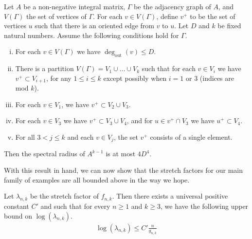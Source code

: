 \begin{lem}
\label{lem:spectral}
Let $A$ be a non-negative integral matrix, $\Gamma$ be the adjacency graph of $A$, and $V(\Gamma)$ the set of
vertices of $\Gamma$. For each $v \in V(\Gamma)$, define $v^+$ to be the set of vertices $u$ such that there
is an oriented edge from $v$ to $u$. Let $D$ and $k$ be fixed natural numbers. Assume the following conditions
hold for $\Gamma$.
\begin{enumerate}[(i)]
\item For each $v \in V(\Gamma)$ we have $\deg_{\text{out}}(v) \leq D$.
\item There is a partition $V(\Gamma) = V_1 \cup \dots \cup V_k$ such that for each $v \in V_i$ we have
  $v^+ \subset V_{i+1}$, for any $1 \leq i \leq k$ except possibly when $i = 1$ or 3 (indices are mod $k$).
\item For each $v \in V_1$, we have $v^+ \subset V_2 \cup V_3$.
\item For each $v \in V_3$ we have $v^+ \subset V_3 \cup V_4$, and for $u \in v^+ \cap V_3$ we have
  $u^+ \subset V_4$.
\item For all $3 < j \leq k$ and each $v \in V_j$, the set $v^+$ consists of a single element.
\end{enumerate}

Then the spectral radius of $A^{k-1}$ is at most $4D^4$.

\end{lem}
With this result in hand, we can now show that the stretch factors for our main family of examples are all
bounded above in the way we hope.

\begin{lem}
  Let $\lambda_{n,k}$ be the stretch factor of $f_{n,k}$. Then there exists a universal positive constant $C'$
  and such that for every $n \geq 1$ and $k \geq 3$, we have the following upper bound on $\log(\lambda_{n,k})$.
  \begin{align*}
   \log(\lambda_{n,k}) \leq C'\frac{n}{g_{n,k}}
  \end{align*}
\end{lem}

